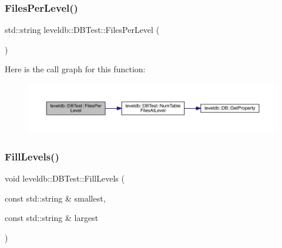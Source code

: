 \subsubsection{\texorpdfstring{FilesPerLevel()}{FilesPerLevel()}}
{\footnotesize\ttfamily std\+::string leveldb\+::\+D\+B\+Test\+::\+Files\+Per\+Level (\begin{DoxyParamCaption}{ }\end{DoxyParamCaption})\hspace{0.3cm}{\ttfamily [inline]}}

Here is the call graph for this function\+:
\nopagebreak
\begin{figure}[H]
\begin{center}
\leavevmode
\includegraphics[width=350pt]{classleveldb_1_1_d_b_test_a0e4d6292bcbe450d34b558d48a51a331_cgraph}
\end{center}
\end{figure}
\mbox{\label{classleveldb_1_1_d_b_test_ac291d06db907f5fee7caf04f44f65493}} 
\subsubsection{\texorpdfstring{FillLevels()}{FillLevels()}}
{\footnotesize\ttfamily void leveldb\+::\+D\+B\+Test\+::\+Fill\+Levels (\begin{DoxyParamCaption}\item[{const std\+::string \&}]{smallest,  }\item[{const std\+::string \&}]{largest }\end{DoxyParamCaption})\hspace{0.3cm}{\ttfamily [inline]}}

